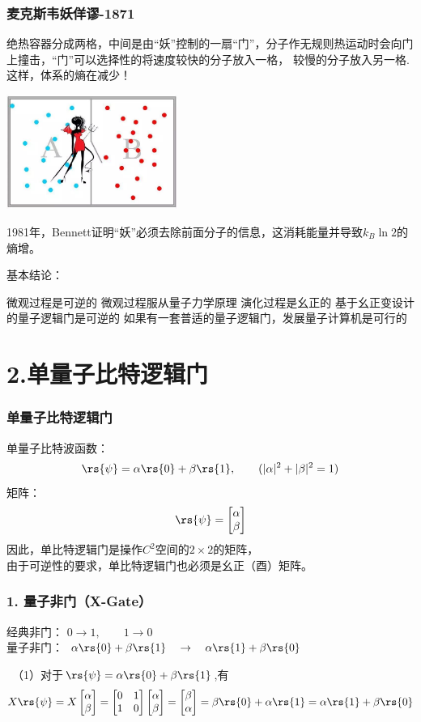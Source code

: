 \begin{frame}{}
        \frametitle{麦克斯韦妖佯谬-1871}
        绝热容器分成两格，中间是由“妖”控制的一扇“门”，分子作无规则热运动时会向门上撞击，“门”可以选择性的将速度较快的分子放入一格，
        较慢的分子放入另一格. 这样，体系的熵在减少！\\
       \begin{center}
        \includegraphics[width=0.42\textwidth]{figs/12.png}     
       \end{center}   
       1981年，Bennett证明“妖”必须去除前面分子的信息，这消耗能量并导致$k_B\ln2$的熵增。 
\end{frame} 

\begin{frame}
    基本结论：\\
   \begin{itemize}
       \IItem 微观过程是可逆的
       \IItem 微观过程服从量子力学原理
       \IItem 演化过程是幺正的
       \IItem 基于幺正变设计的量子逻辑门是可逆的
       \IItem 如果有一套普适的量子逻辑门，发展量子计算机是可行的
   \end{itemize} 
\end{frame} 

\section{2.单量子比特逻辑门}

\begin{frame}
    \frametitle{单量子比特逻辑门}   
单量子比特波函数：
\[\rs{\psi} =\alpha\rs{0}+\beta\rs{1}, \qquad (|\alpha|^2+|\beta|^2=1)\]
矩阵：
 \[ \rs{\psi}=\begin{bmatrix}
    \alpha \\
    \beta
 \end{bmatrix}\]
 因此，单比特逻辑门是操作$C^2$空间的$2\times 2$的矩阵，\\
 由于可逆性的要求，单比特逻辑门也必须是幺正（酉）矩阵。 
\end{frame} 

\begin{frame} 
    \frametitle{1. 量子非门（X-Gate）} 
    经典非门： $0\to 1, \qquad 1 \to 0$ \\
    量子非门： $\alpha\rs{0}+\beta\rs{1} \quad \to \quad\alpha\rs{1}+\beta\rs{0}$ \\ \vspace{1em}

    \证~（1）对于$\rs{\psi} =\alpha\rs{0}+\beta\rs{1}$,有
    \[X \rs{\psi} = X \Qbit{\alpha}{\beta}=\XGate\Qbit{\alpha}{\beta} =\Qbit{\beta}{\alpha}=\beta\rs{0}+\alpha\rs{1}=\alpha\rs{1}+\beta\rs{0}
    \]
\end{frame} 

